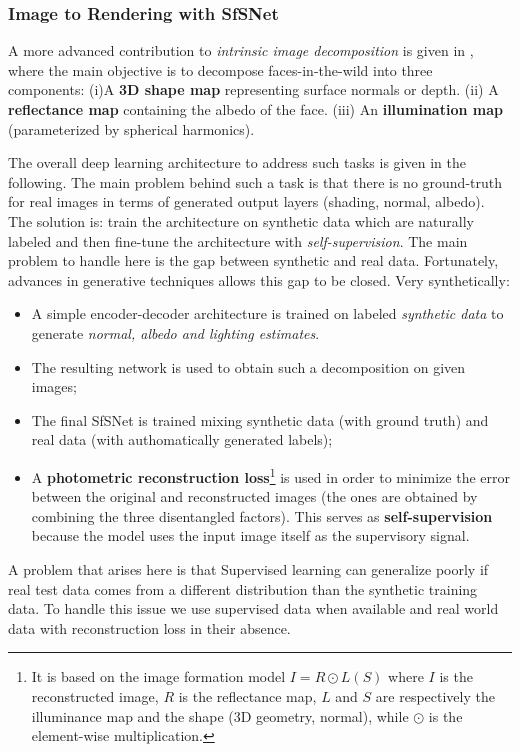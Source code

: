 \subsubsection{Image to Rendering with SfSNet}
A more advanced contribution to \textit{intrinsic image decomposition} is given in \citeauthor{SfSNet2018}, \cite{SfSNet2018} where the main objective is to decompose faces-in-the-wild into three components: (i)A \textbf{3D shape map} representing surface normals or depth. (ii) A \textbf{reflectance map} containing the albedo of the face. (iii) An \textbf{illumination map} (parameterized by spherical harmonics).

The overall deep learning architecture to address such tasks is given in the following. The main problem behind such a task is that there is no ground-truth for real images in terms of generated output layers (shading, normal, albedo). The solution is: train the architecture on synthetic data which are naturally labeled and then fine-tune the architecture with \textit{self-supervision}. The main problem to handle here is the gap between synthetic and real data. Fortunately, advances in generative techniques allows this gap to be closed. Very synthetically: 
\begin{itemize}
    \itemsep-0.3em
    \item A simple encoder-decoder architecture is trained on labeled \textit{synthetic data} to generate \textit{normal, albedo and lighting estimates}.
    \item The resulting network is used to obtain such a decomposition on given images; 
    \item The final SfSNet is trained mixing synthetic data (with ground truth) and real data (with authomatically generated labels); 
    \item A \textbf{photometric reconstruction loss}\footnote{ It is based on the image formation model
        $I=R \odot L(S)$ where $I$ is the reconstructed image, $R$ is the reflectance map, $L$ and $S$ are respectively the illuminance map and the shape (3D geometry, normal), while $\odot$ is the element-wise multiplication. 
    } is used in order to minimize the error between the original and reconstructed images (the ones are obtained by combining the three disentangled factors). This serves as \textbf{self-supervision} because the model uses the input image itself as the supervisory signal.
\end{itemize}
A problem that arises here is that Supervised learning can generalize poorly if real test data comes from a different distribution than the synthetic training data. To handle this issue we use supervised data when available and real world data with reconstruction loss in their absence.

